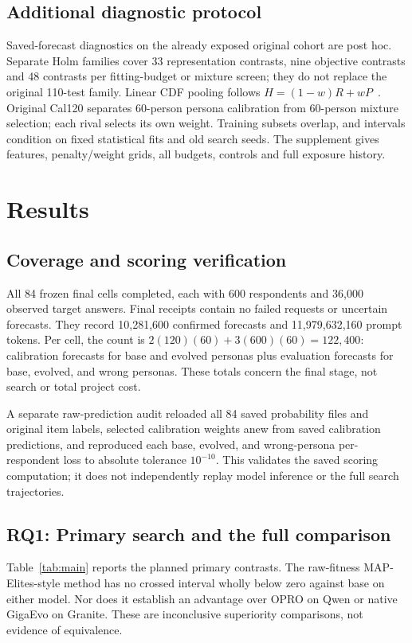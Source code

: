 \documentclass[sigconf,anonymous]{aamas}
\begin{document}
\subsection{Additional diagnostic protocol}\label{sec:diagnostic}
Saved-forecast diagnostics on the already exposed original cohort are post
hoc. Separate Holm families cover 33 representation contrasts, nine objective
contrasts and 48 contrasts per fitting-budget or mixture screen; they do not
replace the original 110-test family. Linear CDF pooling follows
$H=(1-w)R+wP$~\cite{gneiting2011combining}. Original Cal120 separates
60-person persona calibration from 60-person mixture selection; each rival
selects its own weight. Training subsets overlap, and intervals condition on
fixed statistical fits and old search seeds. The supplement gives features,
penalty/weight grids, all budgets, controls and full exposure history.

\section{Results}\label{sec:results}
\subsection{Coverage and scoring verification}
All 84 frozen final cells completed, each with 600 respondents and 36,000
observed target answers. Final receipts contain no failed requests or
uncertain forecasts. They record 10,281,600 confirmed forecasts and
11,979,632,160 prompt tokens. Per cell, the count is
$2(120)(60)+3(600)(60)=122{,}400$: calibration forecasts for base and evolved
personas plus evaluation forecasts for base, evolved, and wrong personas.
These totals concern the final stage, not search or total project cost.

A separate raw-prediction audit reloaded all 84 saved probability files and
original item labels, selected calibration weights anew from saved calibration
predictions, and reproduced each base, evolved, and wrong-persona
per-respondent loss to absolute tolerance $10^{-10}$. This validates the saved
scoring computation; it does not independently replay model inference or the
full search trajectories.

\subsection{RQ1: Primary search and the full comparison}
Table~\ref{tab:main} reports the planned primary contrasts. The raw-fitness
MAP-Elites-style method has no crossed interval wholly below zero against
base on either model. Nor does it establish an advantage over OPRO on Qwen
or native GigaEvo on Granite. These are inconclusive superiority comparisons,
not evidence of equivalence.
\end{document}

